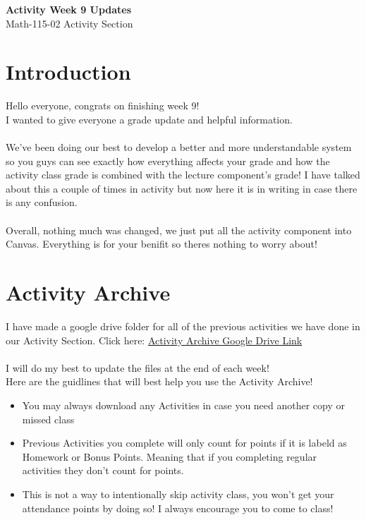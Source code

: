 \documentclass{article}
\begin{document}
\begin{center}
    \Large \textbf{Activity Week 9 Updates} \\
    \vspace{0.2cm}
    \normalsize Math-115-02 Activity Section\\
\end{center}
\section*{Introduction}
Hello everyone, congrats on finishing week 9! \\
I wanted to give everyone a grade update and helpful information.\\
\\
We’ve been doing our best to develop a better and more understandable 
system so you guys can see exactly how everything affects your grade 
and how the activity class grade is combined with the lecture 
component’s grade! I have talked about this a couple of times in 
activity but now here it is in writing in case there is any confusion. 
\\\\
Overall, nothing much was changed, 
we just put all the activity component into Canvas.
Everything is for your benifit so theres nothing to worry about!

\vspace{2cm}

\section*{Activity Archive}
I have made a google drive folder for all of the previous
activities we have done in our Activity Section.
Click here: \href{https://drive.google.com/drive/folders/11neyVp46yyczAnvj1C01ul_MVQoPGQLG?usp=sharing}
{Activity Archive Google Drive Link} \\\\
I will do my best to update the files at the end of each week!
\\
Here are the guidlines that will best help you use 
the Activity Archive!

\begin{itemize}
    \item You may always download any Activities
        in case you need another copy or missed class

    \item Previous Activities you complete will only count
        for points if it is labeld as Homework or Bonus Points. 
        Meaning that if you completing regular \\ 
        activities they don't count for points.

    \item This is not a way to intentionally skip activity
        class, you won't get your attendance points by doing so!
        I always encourage you to come to class!
\end{itemize}
\end{document}
